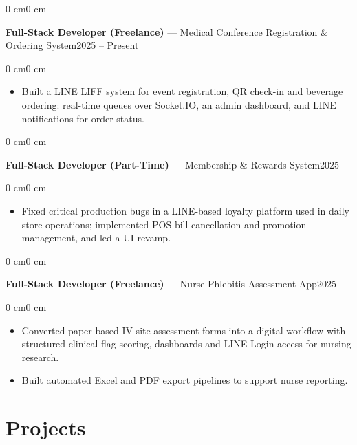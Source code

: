\documentclass[10pt, letterpaper]{article}
\newenvironment{highlights}{
    \begin{itemize}[
        topsep=0.06 cm,
        parsep=0.06 cm,
        itemsep=0pt,
        leftmargin=0 cm + 10pt
    ]
}{
    \end{itemize}
}
\newenvironment{onecolentry}{
    \begin{adjustwidth}{0 cm}{0 cm}
}{
    \end{adjustwidth}
}
\newcommand{\datedentry}[2]{%
  \begin{onecolentry}
    \noindent #1\hfill #2%
  \end{onecolentry}
}
\begin{document}
\vspace{0.12 cm}

\datedentry{\textbf{Full-Stack Developer (Freelance)} — Medical Conference Registration \& Ordering System}{2025 -- Present}
\vspace{0.1 cm}

\begin{onecolentry}
    \begin{highlights}
        \item Built a LINE LIFF system for event registration, QR check-in and beverage ordering: real-time queues over Socket.IO, an admin dashboard, and LINE notifications for order status.
    \end{highlights}
\end{onecolentry}

\vspace{0.12 cm}

\datedentry{\textbf{Full-Stack Developer (Part-Time)} — Membership \& Rewards System}{2025}
\vspace{0.1 cm}

\begin{onecolentry}
    \begin{highlights}
        \item Fixed critical production bugs in a LINE-based loyalty platform used in daily store operations; implemented POS bill cancellation and promotion management, and led a UI revamp.
    \end{highlights}
\end{onecolentry}

\vspace{0.12 cm}

\datedentry{\textbf{Full-Stack Developer (Freelance)} — Nurse Phlebitis Assessment App}{2025}
\vspace{0.1 cm}

\begin{onecolentry}
    \begin{highlights}
        \item Converted paper-based IV-site assessment forms into a digital workflow with structured clinical-flag scoring, dashboards and LINE Login access for nursing research.
        \item Built automated Excel and PDF export pipelines to support nurse reporting.
    \end{highlights}
\end{onecolentry}

\section{Projects}
\end{document}
